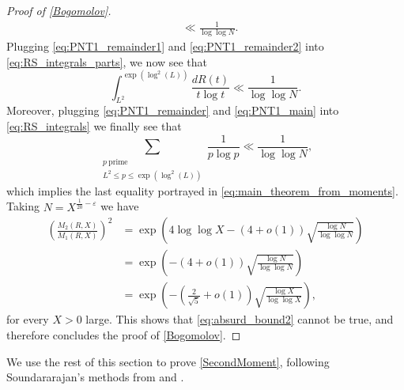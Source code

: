 \documentclass[10pt,a4paper]{amsart}
\theoremstyle{plain}
\theoremstyle{definition}
\theoremstyle{remark}
\begin{document}
\begin{proof}[Proof of \cref{Bogomolov}]
\begin{equation}
\begin{aligned}
        &\ll \frac{1}{\log\log N}.
    \end{aligned}
\end{equation}
Plugging \eqref{eq:PNT1_remainder1} and \eqref{eq:PNT1_remainder2} into \eqref{eq:RS_integrals_parts}, we now see that
\begin{equation} \label{eq:PNT1_remainder}
    \int_{L^2}^{\exp(\log^2(L))} \frac{dR(t)}{t \log t} \ll \frac{1}{\log\log N}.        
\end{equation}
Moreover, plugging \eqref{eq:PNT1_remainder} and \eqref{eq:PNT1_main} into \eqref{eq:RS_integrals} we finally see that
\[
    \sum_{\substack{p \ \text{prime} \\ L^2 \leq p \leq \exp(\log^2(L))}} \frac{1}{p \log p} \ll \frac{1}{\log\log N},
\]
which implies the last equality portrayed in \eqref{eq:main_theorem_from_moments}.
Taking $N = X^{\frac{1}{20}-\varepsilon}$ we have
\begin{equation*}
\begin{aligned}
    \left(\frac{M_2(R,X)}{M_1(R,X)}\right)^2 &= \exp\left(4 \log\log X -(4+o(1))\sqrt{\frac{\log N}{\log\log N}}\right) \\ &= \exp\left(-(4+o(1))\sqrt{\frac{\log N}{\log\log N}}\right) \\ &=
\exp\left(-\left(
\frac{2}{\sqrt{5}}+o(1)\right)\sqrt{\frac{\log X}{\log\log X}}\right),
\end{aligned}
\end{equation*}
for every $X > 0$ large. This shows that \eqref{eq:absurd_bound2} cannot be true, and therefore concludes the proof of \cref{Bogomolov}.
\end{proof}

We use the rest of this section to prove \cref{SecondMoment}, following Soundararajan's methods from \cite{Soundararajan_2000} and \cite{Soundararajan_2008}.
\end{document}
